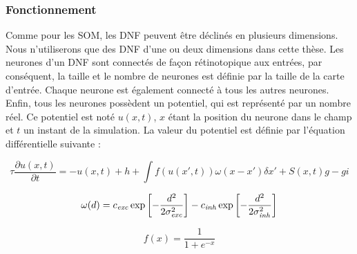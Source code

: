 	\subsubsection{Fonctionnement}

	Comme pour les SOM, les DNF peuvent être déclinés en plusieurs dimensions. Nous n'utiliserons que des DNF d'une ou deux dimensions dans cette thèse. Les neurones d'un DNF sont connectés de façon rétinotopique aux entrées, par conséquent, la taille et le nombre de neurones est définie par la taille de la carte d'entrée. Chaque neurone est également connecté à tous les autres neurones. Enfin, tous les neurones possèdent un potentiel, qui est représenté par un nombre réel. Ce potentiel est noté $u(x,t)$, $x$ étant la position du neurone dans le champ et $t$ un instant de la simulation. La valeur du potentiel est définie par l'équation différentielle suivante :

	\begin{equation}\label{eq:dnf}
		\tau \frac{\partial u(x, t)}{\partial t} = -u(x,t) + h + \int f(u(x',t))\omega(x-x')\delta x' + S(x,t)g - gi
	\end{equation}

	\begin{equation}\label{eq:diff_gauss}
		\omega(d) = c_{\it exc} \exp \left[ - \frac{d^2}{2 \sigma_{\it exc}^2}\right] - c_{\it inh} \exp \left[ - \frac{d^2}{2 \sigma_{\it inh}^2}\right] 
	\end{equation}

	\begin{equation}
		f(x) = \frac{1}{1+e^{-x}}
	\end{equation}

